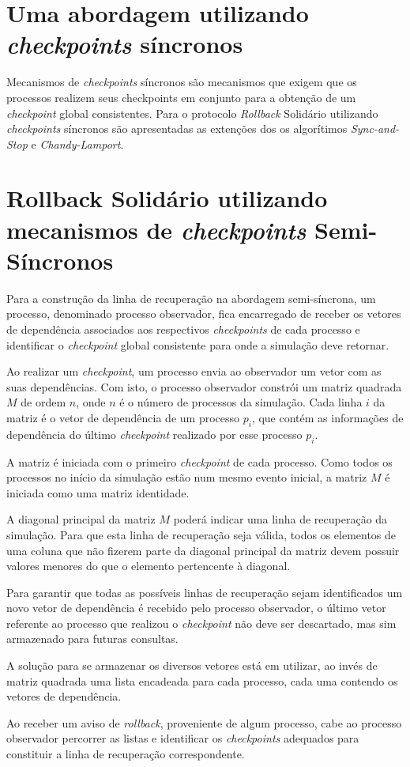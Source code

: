 \section{Uma abordagem utilizando \textit{checkpoints} síncronos}
	Mecanismos de \textit{checkpoints} síncronos são mecanismos que exigem que os processos realizem seus checkpoints em conjunto para a obtenção de um \textit{checkpoint} global consistentes.	 Para o protocolo \textit{Rollback} Solidário utilizando \textit{checkpoints} síncronos são apresentadas as extenções dos os algorítimos \textit{Sync-and-Stop}\cite{Plank93}  e \textit{Chandy-Lamport}\cite{ChandyLamport}.


\section{Rollback Solidário utilizando mecanismos de \textit{checkpoints} Semi-Síncronos}

	Para a construção da linha de recuperação na abordagem semi-síncrona, um processo, denominado processo observador, fica encarregado de receber os vetores de dependência associados aos respectivos \textit{checkpoints} de cada processo e identificar o \textit{checkpoint} global consistente para onde a simulação deve retornar.

	Ao realizar um \textit{checkpoint}, um processo envia ao observador um vetor com as suas dependências. Com isto, o processo observador constrói um matriz quadrada $M$ de ordem $n$, onde $n$ é o número de processos da simulação. Cada linha $i$ da matriz é o vetor de dependência de um processo $p_i$, que contém as informações de dependência do último \textit{checkpoint} realizado por esse processo $p_i$. 

	A matriz é iniciada com o primeiro \textit{checkpoint} de cada processo. Como todos os processos no início da simulação estão num mesmo evento inicial, a matriz $M$ é iniciada como uma matriz identidade.

	A diagonal principal da matriz $M$ poderá indicar uma linha de recuperação da simulação. Para que esta linha de recuperação seja válida, todos os elementos de uma coluna que não fizerem parte da diagonal principal da matriz devem possuir valores menores do que o elemento pertencente à diagonal.  

	Para garantir que todas as possíveis linhas de recuperação sejam identificados um novo vetor de dependência é recebido pelo processo observador, o último vetor referente ao processo que realizou o \textit{checkpoint} não deve ser descartado, mas sim armazenado para futuras consultas.

	A solução para se armazenar os diversos vetores está em utilizar, ao invés de matriz quadrada uma lista encadeada para cada processo, cada uma contendo os vetores de dependência.

	Ao receber um aviso de \textit{rollback}, proveniente de algum processo, cabe ao processo observador percorrer as listas e identificar os \textit{checkpoints} adequados para constituir a linha de recuperação correspondente.
	
	


